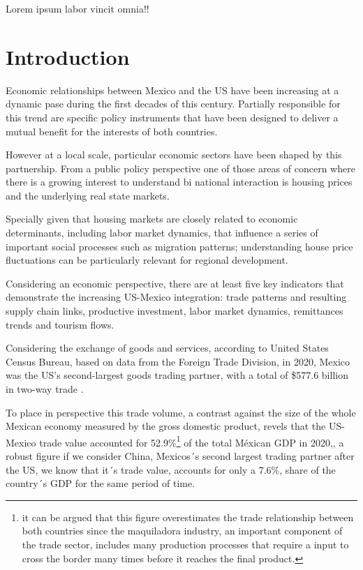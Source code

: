 \documentclass[
]{book}
\begin{document}
Lorem ipsum labor vincit omnia!!

\hypertarget{introduction}{%
\chapter*{Introduction}\label{introduction}}

Economic relationships between Mexico and the US have been increasing at a dynamic pase during the first decades of this century. Partially responsible for this trend are specific policy instruments that have been designed to deliver a mutual benefit for the interests of both countries.

However at a local scale, particular economic sectors have been shaped by this partnership. From a public policy perspective one of those areas of concern where there is a growing interest to understand bi national interaction is housing prices and the underlying real state markets.

Specially given that housing markets are closely related to economic determinants, including labor market dynamics, that influence a series of important social processes such as migration patterns; understanding house price fluctuations can be particularly relevant for regional development.

Considering an economic perspective, there are at least five key indicators that demonstrate the increasing US-Mexico integration: trade patterns and resulting supply chain links, productive investment, labor market dynamics, remittances trends and tourism flows.

Considering the exchange of goods and services, according to United States Census Bureau, based on data from the Foreign Trade Division, in 2020, Mexico was the US's second-largest goods trading partner, with a total of \$577.6 billion in two-way trade \citep{usmexicotrade2020}.

To place in perspective this trade volume, a contrast against the size of the whole Mexican economy measured by the gross domestic product, revels that the US-Mexico trade value accounted for 52.9\%\footnote{it can be argued that this figure overestimates the trade relationship between both countries since the maquiladora industry, an important component of the trade sector, includes many production processes that require a input to cross the border many times before it reaches the final product.} of the total Méxican GDP in 2020,\citep{inegi2020},\citep{mexicoeconomy2020} a robust figure if we consider China, Mexicos´s second largest trading partner after the US, we know that it´s trade value, accounts for only a 7.6\%\citep{mexicoeconomy2020}, \citep{worldbank-mexico-gdp} share of the country´s GDP for the same period of time.
\end{document}
